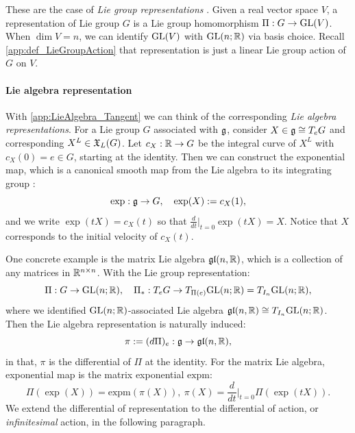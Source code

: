 These are the case of \emph{Lie group representations} \cite{lee2003smooth, hall2013lie}.
Given a real vector space $V$,
a representation of Lie group $G$ is a Lie group homomorphism $\Pi: G \to \text{GL}(V)$.
When $\dim V = n$, we can identify $\text{GL}(V)$ with $\text{GL}(n;\mathbb{R})$ via basis choice.
Recall \cref{app:def_LieGroupAction} that representation is just a linear Lie group action of $G$ on $V$.
\paragraph{Lie algebra representation}
With \cref{app:LieAlgebra_Tangent} we can think of the corresponding \emph{Lie algebra representations}.
For a Lie group $G$ associated with $\mathfrak{g}$,
consider $X \in \mathfrak{g} \cong T_eG$ and corresponding $X^L \in \mathfrak{X}_L(G)$.
Let $c_X: \mathbb{R} \to G$ be the integral curve of $X^L$ with $c_X(0) = e \in G$, starting at the identity.
Then we can construct the exponential map,
which is a canonical smooth map from the Lie algebra to its integrating group \cite{lee2003smooth}:
\begin{equation*}
    \exp: \mathfrak{g} \to G, \quad \exp(X):= c_X(1),
\end{equation*}
and we write $\exp(tX) = c_X(t)$ so that $\frac{d}{dt}\vert_{t=0} \exp(tX) = X$.
Notice that $X$ corresponds to the initial velocity of $c_X(t)$.

One concrete example is the matrix Lie algebra $\mathfrak{gl}(n,\mathbb{R})$, which is a collection of any matrices in $\mathbb{R}^{n \times n}$.
With the Lie group representation:
\begin{equation*}
    \Pi: G \to \text{GL}(n;\mathbb{R}), \quad \Pi_*: T_eG \to T_{\Pi(e)}\text{GL}(n;\mathbb{R}) = T_{I_n}\text{GL}(n;\mathbb{R}),
\end{equation*}
where we identified $\text{GL}(n;\mathbb{R})$-associated Lie algebra
$\mathfrak{gl}(n,\mathbb{R}) \cong T_{I_n}\text{GL}(n;\mathbb{R})$.
Then the Lie algebra representation is naturally induced:
\begin{equation*}
    \pi:= (d \Pi)_e: \mathfrak{g} \to \mathfrak{gl}(n,\mathbb{R}),
\end{equation*}
in that, $\pi$ is the differential of $\Pi$ at the identity.
For the matrix Lie algebra, exponential map is the matrix exponential $\text{expm}$:
\begin{equation}
\label{app:eq_matrixLie_exponential_action}
    \Pi(\exp(X)) = \text{expm} (\pi(X)), \: \pi(X) = \frac{d}{dt}\bigg\vert_{t=0}\Pi(\exp(tX)).
\end{equation}
We extend the differential of representation to the differential of action,
or \emph{infinitesimal} action, in the following paragraph.
